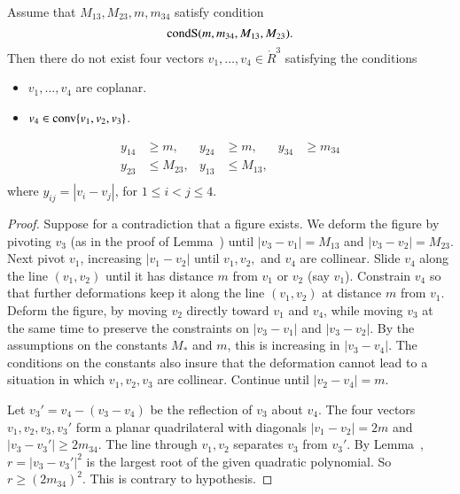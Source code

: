 \begin{lemma}
Assume that $M_{13},M_{23},m,m_{34}$ satisfy condition
   $${\operatorname{condS}}(m,m_{34},M_{13},M_{23}).$$
Then there do not exist four vectors
$v_1,\ldots,v_4\in\ring{R}^3$ satisfying the conditions
	\begin{itemize}
		\item $v_1,\ldots,v_4$ are coplanar.
		\item $v_4\in{\operatorname{conv}}\{v_1,v_2,v_3\}$.
	\end{itemize}
	$$
	\begin{array}{rlrlrl}
		y_{14} &\ge m, &y_{24} &\ge m, &y_{34}&\ge m_{34}\\
		y_{23} &\le  M_{23}, &y_{13} & \le M_{13}, &\\
	\end{array}
	$$
where
$y_{ij}=|v_i-v_j|$,
for $1\le i < j \le 4$.  
\end{lemma}


\begin{proof}  Suppose for a contradiction that a figure exists.
We deform the figure by pivoting $v_3$ 
(as in the proof of Lemma~)
until $|v_3-v_1| = M_{13}$ and $|v_3-v_2|=M_{23}$.   Next pivot $v_1$, increasing $|v_1-v_2|$
until $v_1,v_2,$ and $v_4$ are collinear.  Slide $v_4$ along the line $(v_1,v_2)$ until
it has distance $m$ from $v_1$ or $v_2$ (say $v_1$).   Constrain $v_4$ so that further
deformations keep it along the line $(v_1,v_2)$ at distance $m$ from $v_1$.  
Deform the figure, by moving $v_2$ directly toward $v_1$ and $v_4$, while moving
$v_3$ at the same time to preserve the constraints on $|v_3-v_1|$ and $|v_3-v_2|$.  By
the assumptions on the constants $M_*$ and $m$, this is increasing in $|v_3-v_4|$.  The conditions
on the constants also insure that the deformation cannot lead to a situation in which
$v_1,v_2,v_3$ are collinear.  Continue
until $|v_2-v_4|=m$.

Let $v_3' = v_4 - (v_3-v_4)$ be the reflection of $v_3$ about $v_4$.  The four vectors
$v_1,v_2,v_3,v_3'$ form a planar quadrilateral with diagonals $|v_1-v_2|=2m$ and $|v_3-v_3'| \ge 2m_{34}$.
The line through $v_1,v_2$ separates $v_3$ from $v_3'$.  By Lemma~,  
$r = |v_3-v_3'|^2$ is
the largest root of the given quadratic polynomial.  So $r \ge (2 m_{34})^2$.  This is contrary
to hypothesis.
\end{proof}
\newpage



